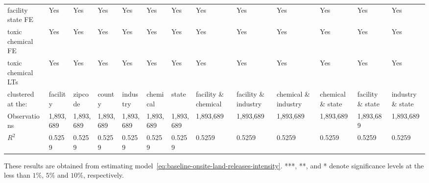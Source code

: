 \begin{table}[H]
{\begin{tabular}{@{}lllllllllllll@{}}
            facility state FE                          & Yes       & Yes       & Yes       & Yes       & Yes       & Yes       & Yes                  & Yes                  & Yes                  & Yes               & Yes               & Yes               \\
            toxic chemical FE                          & Yes       & Yes       & Yes       & Yes       & Yes       & Yes       & Yes                  & Yes                  & Yes                  & Yes               & Yes               & Yes               \\
            toxic chemical LTs                         & Yes       & Yes       & Yes       & Yes       & Yes       & Yes       & Yes                  & Yes                  & Yes                  & Yes               & Yes               & Yes               \\\midrule\midrule
            clustered at the:                          & facility  & zipcode   & county    & industry  & chemical  & state     & facility \& chemical & facility \& industry & chemical \& industry & chemical \& state & facility \& state & industry \& state \\
            Observations                               & 1,893,689 & 1,893,689 & 1,893,689 & 1,893,689 & 1,893,689 & 1,893,689 & 1,893,689            & 1,893,689            & 1,893,689            & 1,893,689         & 1,893,689         & 1,893,689         \\
            $R^2$                                      & 0.5259    & 0.5259    & 0.5259    & 0.5259    & 0.5259    & 0.5259    & 0.5259               & 0.5259               & 0.5259               & 0.5259            & 0.5259            & 0.5259            \\ \bottomrule\bottomrule
        \end{tabular}%
    }
    \begin{minipage}{18cm}
        \vspace{0.05in}
        These results are obtained from estimating model~\ref{eq:baseline-onsite-land-releases-intensity}. ***, **, and * denote significance levels at the less than $1\%$, $5\%$ and $10\%$, respectively.
    \end{minipage}
\end{table}
